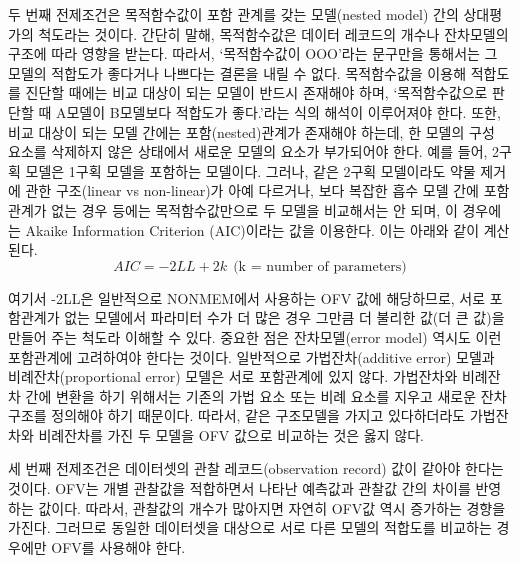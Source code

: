 \documentclass[
  11pt,
  krantz2, a4paper, twoside]{krantz}
\theoremstyle{definition}
\theoremstyle{definition}
\theoremstyle{definition}
\theoremstyle{remark}
\begin{document}
두 번째 전제조건은 목적함수값이 포함 관계를 갖는 모델(nested model) 간의 상대평가의 척도라는 것이다. 간단히 말해, 목적함수값은 데이터 레코드의 개수나 잔차모델의 구조에 따라 영향을 받는다. 따라서, `목적함수값이 OOO'라는 문구만을 통해서는 그 모델의 적합도가 좋다거나 나쁘다는 결론을 내릴 수 없다. 목적함수값을 이용해 적합도를 진단할 때에는 비교 대상이 되는 모델이 반드시 존재해야 하며, `목적함수값으로 판단할 때 A모델이 B모델보다 적합도가 좋다.'라는 식의 해석이 이루어져야 한다. 또한, 비교 대상이 되는 모델 간에는 포함(nested)관계가 존재해야 하는데, 한 모델의 구성 요소를 삭제하지 않은 상태에서 새로운 모델의 요소가 부가되어야 한다. 예를 들어, 2구획 모델은 1구획 모델을 포함하는 모델이다. 그러나, 같은 2구획 모델이라도 약물 제거에 관한 구조(linear vs non-linear)가 아예 다르거나, 보다 복잡한 흡수 모델 간에 포함 관계가 없는 경우 등에는 목적함수값만으로 두 모델을 비교해서는 안 되며, 이 경우에는 Akaike Information Criterion (AIC)이라는 값을 이용한다. 이는 아래와 같이 계산된다.
\begin{equation}
AIC = -2LL + 2k \ \ \text{(k = number of parameters)}
\label{eq:aic}
\end{equation}


여기서 -2LL은 일반적으로 NONMEM에서 사용하는 OFV 값에 해당하므로, 서로 포함관계가 없는 모델에서 파라미터 수가 더 많은 경우 그만큼 더 불리한 값(더 큰 값)을 만들어 주는 척도라 이해할 수 있다. 중요한 점은 잔차모델(error model) 역시도 이런 포함관계에 고려하여야 한다는 것이다. 일반적으로 가법잔차(additive error) 모델과 비례잔차(proportional error) 모델은 서로 포함관계에 있지 않다. 가법잔차와 비례잔차 간에 변환을 하기 위해서는 기존의 가법 요소 또는 비례 요소를 지우고 새로운 잔차구조를 정의해야 하기 때문이다. 따라서, 같은 구조모델을 가지고 있다하더라도 가법잔차와 비례잔차를 가진 두 모델을 OFV 값으로 비교하는 것은 옳지 않다.

세 번째 전제조건은 데이터셋의 관찰 레코드(observation record) 값이 같아야 한다는 것이다. OFV는 개별 관찰값을 적합하면서 나타난 예측값과 관찰값 간의 차이를 반영하는 값이다. 따라서, 관찰값의 개수가 많아지면 자연히 OFV값 역시 증가하는 경향을 가진다. 그러므로 동일한 데이터셋을 대상으로 서로 다른 모델의 적합도를 비교하는 경우에만 OFV를 사용해야 한다.
\end{document}
